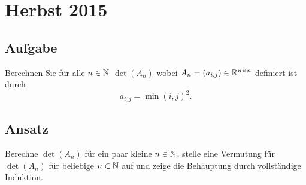 \newpage

\section{Herbst 2015}

\subsection{Aufgabe}
Berechnen Sie für alle \( n \in \mathbb{N} \) \( \det(A_n) \) wobei \( A_n = (a_{i,j}) \in \mathbb{R}^{n \times n} \) definiert ist durch
\begin{equation*}
	a_{i,j} = \min(i,j)^2\text{.} 
\end{equation*}

\subsection{Ansatz}
Berechne \( \det(A_n) \) für ein paar kleine \( n \in \mathbb{N} \), stelle eine Vermutung für \( \det(A_n) \) für beliebige \( n \in \mathbb{N} \) auf und zeige die Behauptung durch vollständige Induktion.

